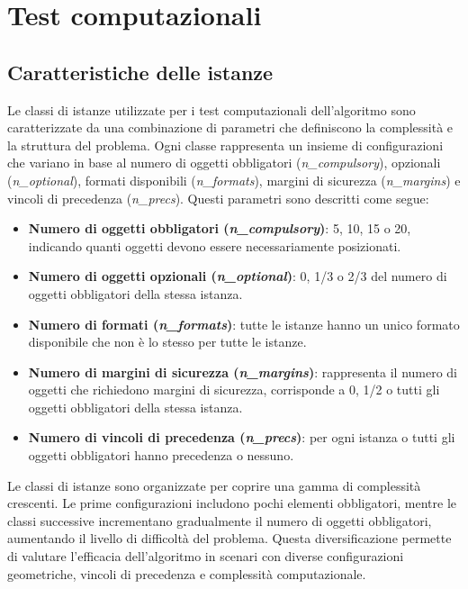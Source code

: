 \chapter{Test computazionali}
\label{cap:verifica-validazione}

\section{Caratteristiche delle istanze}

Le classi di istanze utilizzate per i test computazionali dell'algoritmo sono caratterizzate da una combinazione di parametri che definiscono la complessità e la struttura del problema. Ogni classe rappresenta un insieme di configurazioni che variano in base al numero di oggetti obbligatori (\emph{n\_compulsory}), opzionali (\emph{n\_optional}), formati disponibili (\emph{n\_formats}), margini di sicurezza (\emph{n\_margins}) e vincoli di precedenza (\emph{n\_precs}). Questi parametri sono descritti come segue:

\begin{itemize}
    \item \textbf{Numero di oggetti obbligatori (\emph{n\_compulsory})}: 5, 10, 15 o 20, indicando quanti oggetti devono essere necessariamente posizionati.
    \item \textbf{Numero di oggetti opzionali (\emph{n\_optional})}: 0, 1/3 o 2/3 del numero di oggetti obbligatori della stessa istanza.
    \item \textbf{Numero di formati (\emph{n\_formats})}: tutte le istanze hanno un unico formato disponibile che non è lo stesso per tutte le istanze.
    \item \textbf{Numero di margini di sicurezza (\emph{n\_margins})}: rappresenta il numero di oggetti che richiedono margini di sicurezza, corrisponde a 0, 1/2 o tutti gli oggetti obbligatori della stessa istanza.
    \item \textbf{Numero di vincoli di precedenza (\emph{n\_precs})}: per ogni istanza o tutti gli oggetti obbligatori hanno precedenza o nessuno. 
\end{itemize}

Le classi di istanze sono organizzate per coprire una gamma di complessità crescenti. Le prime configurazioni includono pochi elementi obbligatori, mentre le classi successive incrementano gradualmente il numero di oggetti obbligatori, aumentando il livello di difficoltà del problema. Questa diversificazione permette di valutare l'efficacia dell'algoritmo in scenari con diverse configurazioni geometriche, vincoli di precedenza e complessità computazionale. 

